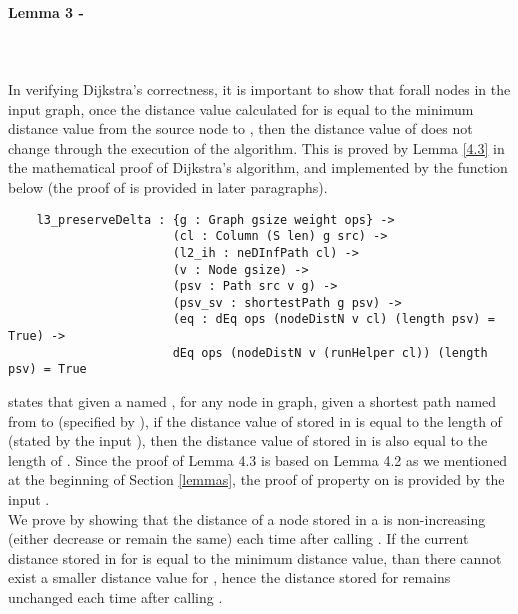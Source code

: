 \paragraph{Lemma 3 - } \label{lemma3V}
\tab\\\\
In verifying Dijkstra's correctness, it is important to show that forall nodes  in the input graph, once the distance value calculated for  is equal to the minimum distance value from the source node to , then the distance value of  does not change through the execution of the algorithm. This is proved by Lemma \ref{4.3} in the mathematical proof of Dijkstra's algorithm, and implemented by the function  below (the proof of  is provided in later paragraphs). 
\begin{lstlisting}
	l3_preserveDelta : {g : Graph gsize weight ops} ->
	                   (cl : Column (S len) g src) ->
	                   (l2_ih : neDInfPath cl) ->
	                   (v : Node gsize) ->
	                   (psv : Path src v g) ->
	                   (psv_sv : shortestPath g psv) ->
	                   (eq : dEq ops (nodeDistN v cl) (length psv) = True) ->
	                   dEq ops (nodeDistN v (runHelper cl)) (length psv) = True
\end{lstlisting}

 states that given a  named , for any node  in graph, given a shortest path named  from  to  (specified by ), if the distance value of  stored in  is equal to the length of (stated by the input ), then the distance value of  stored in  is also equal to the length of . Since the proof of Lemma 4.3 is based on Lemma 4.2 as we mentioned at the beginning of Section \ref{lemmas}, the proof of property  on  is provided by the input . 
\\

We prove  by showing that the distance of a node  stored in a  is non-increasing (either decrease or remain the same) each time after calling . If the current distance stored in  for  is equal to the minimum distance value, than there cannot exist a smaller distance value for , hence the distance stored for  remains unchanged each time after calling .
\\

